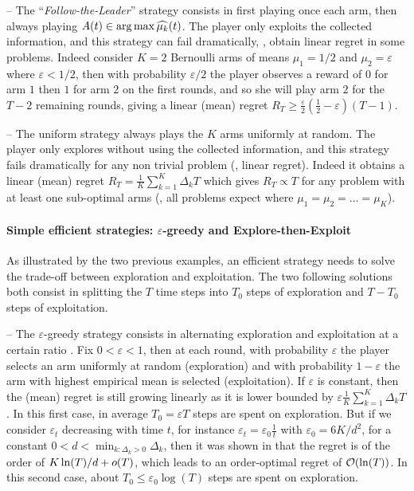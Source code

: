 -- The ``\emph{Follow-the-Leader}'' strategy consists in first playing once each arm, then always playing $A(t)\in\operatorname*{arg\,max} \widehat{\mu_k}(t)$.
The player only exploits the collected information, and this strategy can fail dramatically, \ie, obtain linear regret in some problems.
Indeed consider $K=2$ Bernoulli arms of means $\mu_1=1/2$ and $\mu_2=\varepsilon$ where $\varepsilon < 1/2$, then with probability $\varepsilon/2$ the player observes a reward of $0$ for arm $1$ then $1$ for arm $2$ on the first rounds, and so she will play arm $2$ for the $T-2$ remaining rounds, giving a linear (mean) regret $R_T \geq \frac{\varepsilon}{2}\left(\frac{1}{2} - \varepsilon\right) (T-1)$.

-- The uniform strategy always plays the $K$ arms uniformly at random.
The player only explores without using the collected information, and this strategy fails dramatically for any non trivial problem (\ie, linear regret).
Indeed it obtains a linear (mean) regret $R_T = \frac{1}{K} \sum_{k=1}^K \Delta_k T$
which gives $R_T \propto T$ for any problem with at least one sub-optimal arms (\ie, all problems expect where $\mu_1=\mu_2=\dots=\mu_K$).


\paragraph{Simple efficient strategies: $\varepsilon$-greedy and Explore-then-Exploit}

As illustrated by the two previous examples, an efficient strategy needs to solve the trade-off between exploration and exploitation.
The two following solutions both consist in splitting the $T$ time steps into $T_0$ steps of exploration and $T-T_0$ steps of exploitation.

-- The $\varepsilon$-greedy strategy consists in alternating exploration and exploitation at a certain ratio \cite{SuttonBarto2018,Bubeck12,LattimoreBanditAlgorithmsBook}.
Fix $0<\varepsilon<1$, then at each round, with probability $\varepsilon$ the player selects an arm uniformly at random (exploration) and with probability $1-\varepsilon$ the arm with highest empirical mean is selected (exploitation).
If $\varepsilon$ is constant, then the (mean) regret is still growing linearly as it is lower bounded by $\varepsilon \frac{1}{K} \sum_{k=1}^K \Delta_k T$.
In this first case, in average $T_0 = \varepsilon T$ steps are spent on exploration.
%
But if we consider $\varepsilon_t$ decreasing with time $t$, for instance $\varepsilon_t = \varepsilon_0 \frac{1}{t}$ with $\varepsilon_0 = 6 K / d^2$, for a constant $0 < d < \min_{k: \Delta_k > 0} \Delta_k$,
then it was shown in \cite{Auer02} that the regret is of the order of $K \ln(T) / d + \mathop{}\mathopen{}o\mathopen{}\left(T\right)$, which leads to an order-optimal regret of $\mathop{}\mathopen{}\mathcal{O}\mathopen{}\left(\ln(T)\right)$.
In this second case, about $T_0 \leq \varepsilon_0 \log(T)$ steps are spent on exploration.


